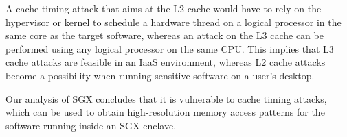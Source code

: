 \begin{table}[hbt]
  \caption{
    Approximate sizes and access times for each level in the memory
    hierarchy of an Intel processor, from \cite{intel2010perfanalysis}. Memory
    sizes and access times differ by orders of magnitude across the different
    levels of the hierarchy. This table does not cover multi-processor systems.
  }
  \label{fig:cache_timings}
\end{table}

A cache timing attack that aims at the L2 cache would have to rely on the
hypervisor or kernel to schedule a hardware thread on a logical processor in
the same core as the target software, whereas an attack on the L3 cache can be
performed using any logical processor on the same CPU. This implies that L3
cache attacks are feasible in an IaaS environment, whereas L2 cache attacks
become a possibility when running sensitive software on a user's desktop.

Our analysis of SGX concludes that it is vulnerable to cache timing attacks,
which can be used to obtain high-resolution memory access patterns for the
software running inside an SGX enclave.
